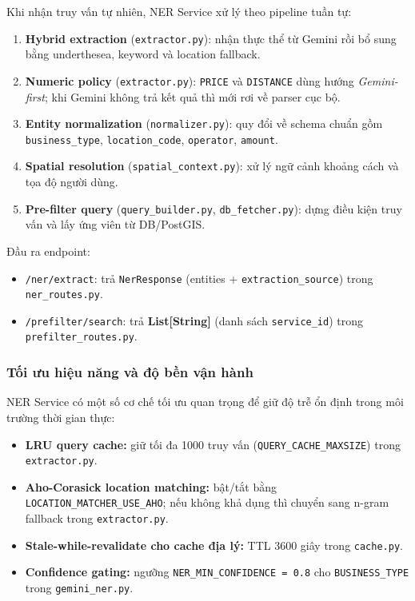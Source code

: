Khi nhận truy vấn tự nhiên, NER Service xử lý theo pipeline tuần tự:
\begin{enumerate}
    \item \textbf{Hybrid extraction} (\texttt{extractor.py}): nhận thực thể từ Gemini rồi bổ sung bằng underthesea, keyword và location fallback.
    \item \textbf{Numeric policy} (\texttt{extractor.py}): \texttt{PRICE} và \texttt{DISTANCE} dùng hướng \textit{Gemini-first}; khi Gemini không trả kết quả thì mới rơi về parser cục bộ.
    \item \textbf{Entity normalization} (\texttt{normalizer.py}): quy đổi về schema chuẩn gồm \texttt{business\_type}, \texttt{location\_code}, \texttt{operator}, \texttt{amount}.
    \item \textbf{Spatial resolution} (\texttt{spatial\_context.py}): xử lý ngữ cảnh khoảng cách và tọa độ người dùng.
    \item \textbf{Pre-filter query} (\texttt{query\_builder.py}, \texttt{db\_fetcher.py}): dựng điều kiện truy vấn và lấy ứng viên từ DB/PostGIS.
\end{enumerate}

Đầu ra endpoint:
\begin{itemize}
    \item \texttt{/ner/extract}: trả \texttt{NerResponse} (entities + \texttt{extraction\_source}) trong \texttt{ner\_routes.py}.
    \item \texttt{/prefilter/search}: trả \textbf{List[String]} (danh sách \texttt{service\_id}) trong \texttt{prefilter\_routes.py}.
\end{itemize}

\subsubsection{Tối ưu hiệu năng và độ bền vận hành}

NER Service có một số cơ chế tối ưu quan trọng để giữ độ trễ ổn định trong môi trường thời gian thực:
\begin{itemize}
    \item \textbf{LRU query cache:} giữ tối đa 1000 truy vấn (\texttt{QUERY\_CACHE\_MAXSIZE}) trong \texttt{extractor.py}.
    \item \textbf{Aho-Corasick location matching:} bật/tắt bằng \texttt{LOCATION\_MATCHER\_USE\_AHO}; nếu không khả dụng thì chuyển sang n-gram fallback trong \texttt{extractor.py}.
    \item \textbf{Stale-while-revalidate cho cache địa lý:} TTL 3600 giây trong \texttt{cache.py}.
    \item \textbf{Confidence gating:} ngưỡng \texttt{NER\_MIN\_CONFIDENCE = 0.8} cho \texttt{BUSINESS\_TYPE} trong \texttt{gemini\_ner.py}.
\end{itemize}

